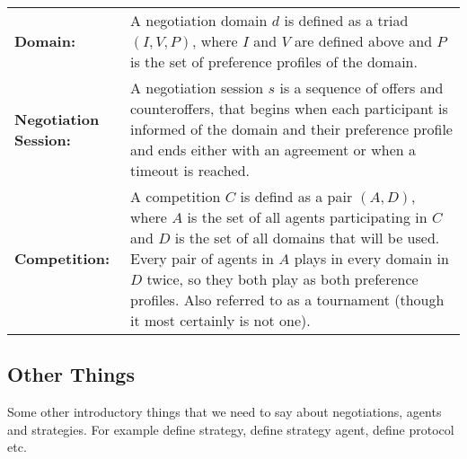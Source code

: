 \begin{longtable}{l p{290pt}}
                \textbf{Domain:} & A negotiation domain $d$ is defined as a triad $(I, V, P)$, where $I$ and $V$ are defined above and $P$ is the set of preference profiles of the domain\protect\footnotemark.\\

                \textbf{Negotiation Session:} & A negotiation session $s$ is a sequence of offers and counteroffers, that begins when each participant is informed of the domain and their preference profile and ends either with an agreement or when a timeout is reached. \\

                \textbf{Competition:} & A competition $C$ is defind as a pair $(A, D)$, where $A$ is the set of all agents participating in $C$ and $D$ is the set of all domains that will be used. Every pair of agents in $A$ plays in every domain in $D$ twice, so they both play as both preference profiles. Also referred to as a tournament (though it most certainly is not one).\\	%

        \end{longtable}



\subsection{Other Things}	\label{sec:introduction.other_things}
    Some other introductory things that we need to say about negotiations, agents and strategies.
    For example define strategy, define strategy agent, define protocol etc.
